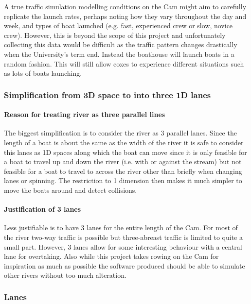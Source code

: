       A true traffic simulation modelling conditions on the Cam might aim to carefully replicate the launch rates, perhaps noting how they vary throughout the day and week, and types of boat launched (e.g. fast, experienced crew or slow, novice crew). However, this is beyond the scope of this project and unfortunately collecting this data would be difficult as the traffic pattern changes drastically when the University's term end. Instead the boathouse will launch boats in a random fashion. This will still allow coxes to experience different situations such as lots of boats launching.
      
      \subsubsection{Simplification from 3D space to into three 1D lanes}

      \paragraph{Reason for treating river as three parallel lines}      
      The biggest simplification is to consider the river as 3 parallel lanes. Since the length of a boat is about the same as the width of the river it is safe to consider this lanes as 1D spaces along which the boat can move since it is only feasible for a boat to travel up and down the river (i.e. with or against the stream) but not feasible for a boat to travel to across the river other than briefly when changing lanes or spinning. The restriction to 1 dimension then makes it much simpler to move the boats around and detect collisions.
      
      \paragraph{Justification of 3 lanes}
      Less justifiable is to have 3 lanes for the entire length of the Cam. For most of the river two-way traffic is possible but three-abreast traffic is limited to quite a small part. However, 3 lanes allow for some interesting behaviour with a central lane for overtaking. Also while this project takes rowing on the Cam for inspiration as much as possible the software produced should be able to simulate other rivers without too much alteration.
      
      \subsubsection{Lanes}
